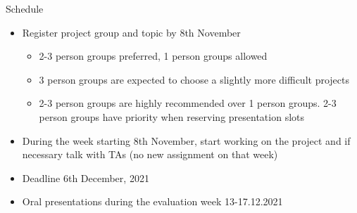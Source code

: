 \documentclass[t]{beamer}
\begin{document}
\begin{frame}
  
  {\Large\color{navyblue} Schedule}


  \begin{itemize}
  \item Register project group and topic by 8th November
    \begin{itemize}
    \item 2-3 person groups preferred, 1 person groups allowed
    \item 3 person groups are expected to choose a slightly more difficult projects
	\item 2-3 person groups are highly recommended over 1 person groups. 2-3 person groups have priority when reserving presentation slots
    \end{itemize}
  \item During the week starting 8th November, start working on the
    project and if necessary talk with TAs (no new assignment on that
    week)
  \item Deadline 6th December, 2021
  \item Oral presentations during the evaluation week 13-17.12.2021
  \end{itemize}
  
\end{frame}
\end{document}
